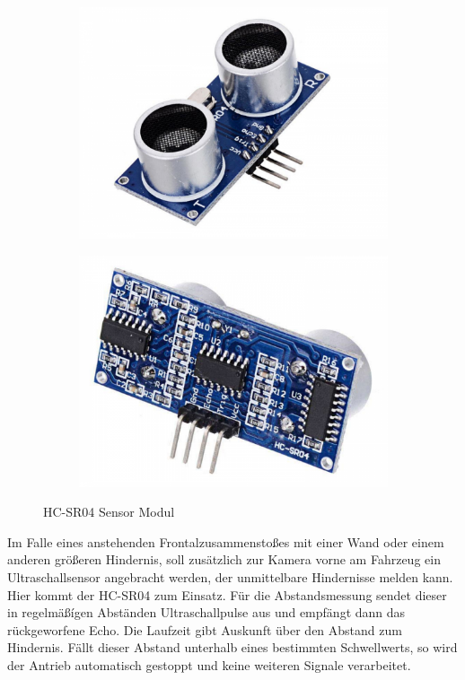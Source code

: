     \begin{figure}[H]
    \center
    \begin{subfigure}{.5\textwidth}
      \centering
      \includegraphics[width=.8\linewidth]{images/hw_hcsr04_01.png}
    \end{subfigure}%
    \begin{subfigure}{.5\textwidth}
      \centering
      \includegraphics[width=.8\linewidth]{images/hw_hcsr04_02.png}
    \end{subfigure}
      \caption{HC-SR04 Sensor Modul}
      \label{fig:img-hw-04}
    \end{figure}
    \vspace{1cm}
    Im Falle eines anstehenden Frontalzusammenstoßes mit einer Wand oder einem
    anderen größeren Hindernis, soll zusätzlich zur Kamera vorne am Fahrzeug ein
    Ultraschallsensor angebracht werden, der unmittelbare Hindernisse melden
    kann. Hier kommt der HC-SR04 zum Einsatz. Für die Abstandsmessung sendet
    dieser in regelmäßígen Abständen Ultraschallpulse aus und empfängt dann das
    rückgeworfene Echo. Die Laufzeit gibt Auskunft über den Abstand zum
    Hindernis. Fällt dieser Abstand unterhalb eines bestimmten Schwellwerts, so
    wird der Antrieb automatisch gestoppt und keine weiteren Signale
    verarbeitet.


